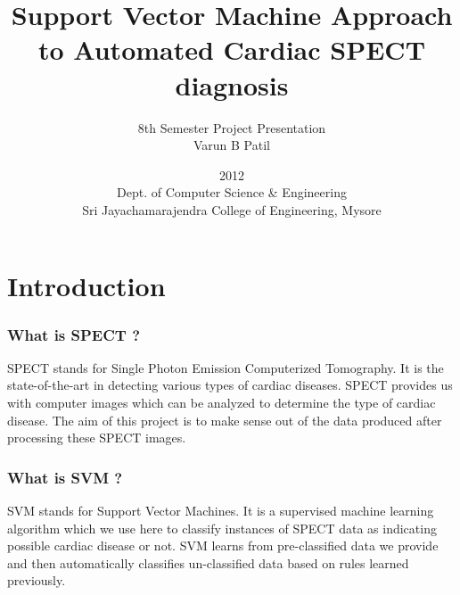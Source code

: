 \documentclass[11pt,xcolor=dvipsnames]{beamer}
\title{Support Vector Machine Approach to Automated Cardiac SPECT diagnosis}
\author[]{8th Semester Project Presentation \\[1cm]Varun B Patil \\[1.2cm]}
\date{2012 \small \\[0.2cm]Dept. of Computer Science \& Engineering \\[0.2cm]Sri Jayachamarajendra College of Engineering, Mysore}
\begin{document}
\begingroup	%
\makeatletter	%
\setlength{\hoffset}{-.5\beamer@sidebarwidth}	%
\makeatother
\begin{frame}[plain]	%
\titlepage
\end{frame}
\endgroup





\section{Introduction}	%
\begin{frame}
\frametitle{What is SPECT ?}			%

\justifying
SPECT stands for {\color{PineGreen}Single Photon Emission Computerized Tomography}. It is the state-of-the-art in detecting various types of cardiac diseases. SPECT provides us with computer images which can be analyzed to determine the type of cardiac disease. The aim of this project is to make sense out of the data produced after processing these SPECT images.\\
\end{frame}





\begin{frame}
\frametitle{What is SVM ?}	
\justifying
SVM stands for {\color{PineGreen}Support Vector Machines}. It is a supervised machine learning algorithm which we use here to classify instances of SPECT data as indicating possible cardiac disease or not. SVM learns from pre-classified data we provide and then automatically classifies un-classified data based on rules learned previously. \\
\end{frame}
\end{document}
